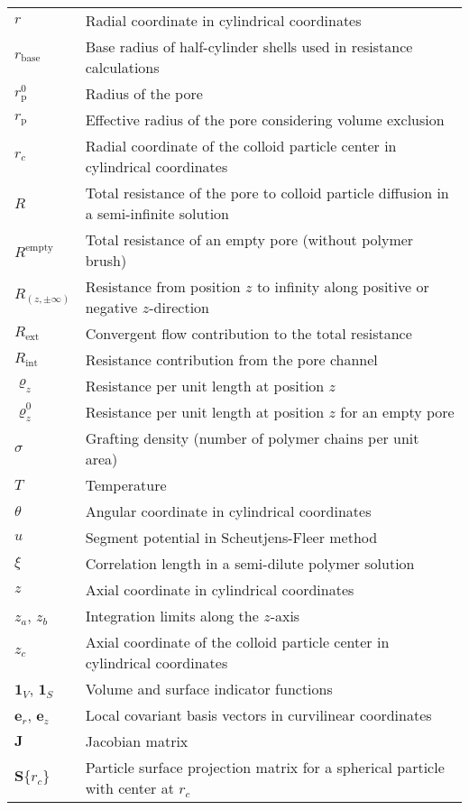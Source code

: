 \documentclass[10pt, a4paper]{article}
\begin{document}
\begin{tabularx}{\linewidth}{l X}
    $r$ & Radial coordinate in cylindrical coordinates \\
    $r_{\text{base}}$ & Base radius of half-cylinder shells used in resistance calculations\\
    $r_{\text{p}}^{0}$ & Radius of the pore \\
    $r_{\text{p}}$ & Effective radius of the pore considering volume exclusion \\
    $r_{c}$ & Radial coordinate of the colloid particle center in cylindrical coordinates \\
    $R$ & Total resistance of the pore to colloid particle diffusion in a semi-infinite solution \\
    $R^{\text{empty}}$ & Total resistance of an empty pore (without polymer brush) \\
    $R_{(z, \pm\infty)}$ & Resistance from position $z$ to infinity along positive or negative $z$-direction \\
    $R_{\text{ext}}$ & Convergent flow contribution to the total resistance \\
    $R_{\text{int}}$ & Resistance contribution from the pore channel \\
    $\varrho_{z}$ & Resistance per unit length at position $z$ \\
    $\varrho_{z}^{0}$ & Resistance per unit length at position $z$ for an empty pore \\
    $\sigma$ & Grafting density (number of polymer chains per unit area) \\
    $T$ & Temperature \\
    $\theta$ & Angular coordinate in cylindrical coordinates \\
    $u$ & Segment potential in Scheutjens-Fleer method\\
    $\xi$ & Correlation length in a semi-dilute polymer solution \\
    $z$ & Axial coordinate in cylindrical coordinates \\
    $z_a$, $z_b$ & Integration limits along the $z$-axis \\
    $z_{c}$ & Axial coordinate of the colloid particle center in cylindrical coordinates \\
    $\bm{1}_{V}$, $\bm{1}_{S}$ & Volume and surface indicator functions \\
    $\bm{e}_r$, $\bm{e}_z$ & Local covariant basis vectors in curvilinear coordinates \\
    $\bm{J}$ & Jacobian matrix \\
    $\bm{S}\{r_{c}\}$ & Particle surface projection matrix for a spherical particle with center at $r_{c}$ \\

\end{tabularx}
\end{document}
